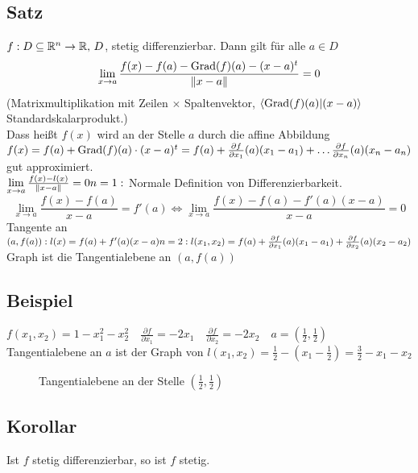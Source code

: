 \subsection{Satz}\label{sec:\thesubsection}
$f : D \subseteq \mathbb{R}^n \to \mathbb{R},\, D$, stetig differenzierbar. Dann gilt für alle $a \in D$
\[ \lim_{x\to a} \frac{f(x) - f(a) - \operatorname{Grad}(f)(a) - (x-a)^t}{\Vert x-a\Vert} = 0 \]
(Matrixmultiplikation mit Zeilen $\times$ Spaltenvektor, $\langle \operatorname{Grad}(f)(a)| (x-a)\rangle$ Standardskalarprodukt.)\\
Dass hei\ss t $f(x)$ wird an der Stelle $a$ durch die affine Abbildung $f(x) = f(a) + \operatorname{Grad}(f)(a) \cdot (x-a)^t = f(a) + \frac{\partial f}{\partial x_1}(a) (x_1 -a_1) + \ldots \frac{\partial f}{\partial x_n}(a) (x_n -a_n)$ gut approximiert.\\
$\lim\limits_{x\to a} \frac{f(x) -l(x)}{\Vert x-a\Vert} = 0\\
n= 1:$ Normale Definition von Differenzierbarkeit.
\[\lim_{x \to a} \frac{f(x) - f(a)}{x-a} = f'(a) \Leftrightarrow \lim_{x \to a} \frac{f(x) - f(a)-f'(a)(x-a)}{x-a} = 0 \]
Tangente an $(a,f(a)): l(x) = f(a) + f'(a)(x-a)\\
n = 2: l(x_1,x_2) = f(a) + \frac{\partial f}{\partial x_1}(a) (x_1 - a_1) + \frac{\partial f}{\partial x_2}(a) (x_2 -a_2)$
Graph ist die Tangentialebene an $(a,f(a))$
\subsection{Beispiel}\label{sec:\thesubsection}
\(f(x_1,x_2) = 1 - x^2_1 - x^2_2 \quad \frac{\partial f}{\partial x_1} = -2x_1\quad \frac{\partial f}{\partial x_2} = -2x_2 \quad a = \left(\frac12,\frac12\right)\)\\
Tangentialebene an $a$ ist der Graph von \(l(x_1,x_2) = \frac12 - (x_1 - \frac12) = \frac32 - x_1 - x_2 \)
\begin{figure}[h!]
\centering
{}
\caption{Tangentialebene an der Stelle $(\frac12,\frac12)$}
\end{figure}
\subsection{Korollar}\label{sec:\thesubsection}
Ist $f$ stetig differenzierbar, so ist $f$ stetig.
